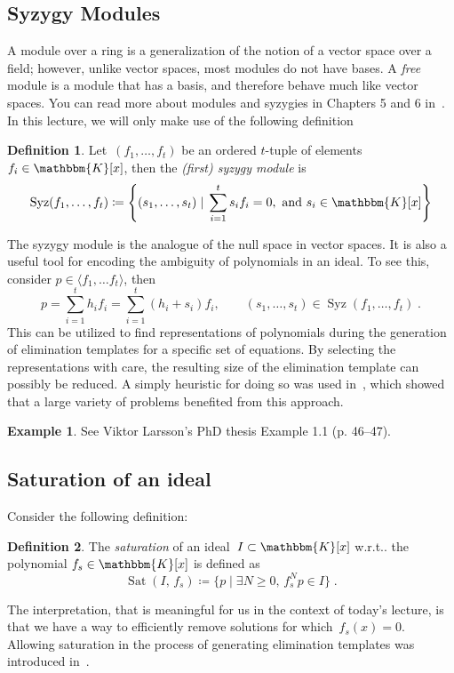 \documentclass[11pt,a4paper]{article}
\makeatletter
\theoremstyle{definition}
\newtheorem{example}{Example}
\newtheorem{definition}{Definition}
\newcommand{\te}[1]{\text{#1}}
\newcommand{\K}{\ensuremath{\mathbbm{K}}}
\DeclareMathOperator{\syz}{Syz}
\DeclareMathOperator{\sat}{Sat}
\DeclareRobustCommand\wrt{w.r.t\@ifnextchar.{}{.\@}}
\makeatother
\begin{document}
\subsection{Syzygy Modules}
A module over a ring is a generalization of the notion of a vector space over a field; however,
unlike vector spaces, most modules do not have bases.
A \emph{free} module is a module that has a basis, and therefore behave much like vector spaces.
You can read more about modules and syzygies in Chapters 5 and 6 in~\cite{cox2}.
In this lecture, we will only make use of the following definition
\begin{definition}
Let~$(f_1,\ldots,f_t)$ be an ordered $t$-tuple of elements
$f_i\in\K[x]$, then the \emph{(first) syzygy module} is
\begin{equation}
\syz(f_1,\ldots,f_t) \coloneqq \left\{
    (s_1,\ldots,s_t)\;|\; \sum_{i=1}^t s_if_i=0, \te{ and } s_i\in\K[x]
\right\}
\end{equation}
\end{definition}
The syzygy module is the analogue of the null space in vector spaces. It is also a useful tool
for encoding the ambiguity of polynomials in an ideal. To see this, consider
$p\in \langle f_1,\ldots f_t\rangle$, then
\begin{equation}
    p = \sum_{i=1}^t h_if_i = \sum_{i=1}^t (h_i+s_i)f_i, \qquad (s_1,\ldots,s_t)\in\syz(f_1,\ldots,f_t)\;.
\end{equation}
This can be utilized to find representations of polynomials during the generation of elimination
templates for a specific set of equations. By selecting the representations with care,
the resulting size of the elimination template can possibly be reduced. A simply heuristic for
doing so was used in~\cite{larsson2017cvpr}, which showed that a large variety of problems benefited
from this approach.

\begin{example}
See Viktor Larsson's PhD thesis Example 1.1 (p. 46--47).
\end{example}

\subsection{Saturation of an ideal}
Consider the following definition:
\begin{definition}
The \emph{saturation} of an ideal~$I\subset\K[x]$ \wrt{} the polynomial $f_s\in\K[x]$ is
defined as
\begin{equation}
    \sat(I,\, f_s) \coloneqq \{p\;|\;\exists N\geq 0,\, f_s^N p\in I  \}\;.
\end{equation}
\end{definition}
The interpretation, that is meaningful for us in the context of today's lecture, is that we
have a way to efficiently remove solutions for which~$f_s(x) =0$.
Allowing saturation in the process of generating elimination templates was introduced
in~\cite{larsson2017iccv}.
\end{document}
